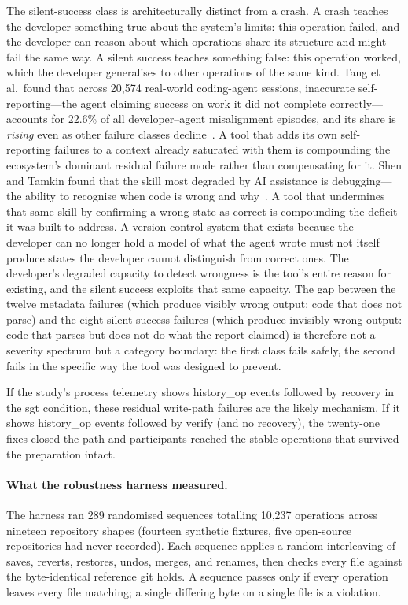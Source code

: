 The silent-success class is architecturally distinct from a crash. A crash
teaches the developer something true about the system's limits: this operation
failed, and the developer can reason about which operations share its structure
and might fail the same way. A silent success teaches something false: this
operation worked, which the developer generalises to other operations of the
same kind. Tang et al.\ found that across 20{,}574 real-world coding-agent
sessions, inaccurate self-reporting---the agent claiming success on work it did
not complete correctly---accounts for 22.6\% of all developer--agent
misalignment episodes, and its share is \emph{rising} even as other failure
classes decline~\cite{tang2026agentfailures}. A tool that adds its own
self-reporting failures to a context already saturated with them is compounding
the ecosystem's dominant residual failure mode rather than compensating for it.
Shen and Tamkin found that the skill most degraded by AI assistance
is debugging---the ability to recognise when code is wrong and
why~\cite{shen2026skills}. A tool that undermines that same skill by
confirming a wrong state as correct is compounding the deficit it was
built to address. A version control system that exists because the developer
can no longer hold a model of what the agent wrote must not itself produce
states the developer cannot distinguish from correct ones. The developer's
degraded capacity to detect wrongness is the tool's entire
reason for existing, and the silent success exploits that same capacity. The gap between the twelve metadata failures (which
produce visibly wrong output: code that does not parse) and the eight
silent-success failures (which produce invisibly wrong output: code that
parses but does not do what the report claimed) is therefore not a severity
spectrum but a category boundary: the first class fails safely, the second
fails in the specific way the tool was designed to prevent.

If the study's process telemetry shows history\_op events followed by recovery
in the sgt condition, these residual write-path failures are the likely
mechanism. If it shows history\_op events followed by verify (and no recovery),
the twenty-one fixes closed the path and participants reached the stable
operations that survived the preparation intact.

\paragraph{What the robustness harness measured.}
The harness ran 289 randomised sequences totalling 10{,}237 operations across
nineteen repository shapes (fourteen synthetic fixtures, five open-source
repositories \sgt{} had never recorded). Each sequence applies a random
interleaving of saves, reverts, restores, undos, merges, and renames, then
checks every file against the byte-identical reference git holds. A sequence
passes only if every operation leaves every file matching; a single differing
byte on a single file is a violation.

